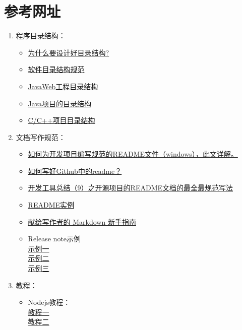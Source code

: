 \section{参考网址}
\begin{enumerate}
	
  \item 程序目录结构：
  \begin{itemize}
        \item
               \href{https://blog.csdn.net/aocheng6822/article/details/102252251?depth_1-utm_source=distribute.pc_relevant.none-task&utm_source=distribute.pc_relevant.none-task} {为什么要设计好目录结构?}
        \item \href{https://www.cnblogs.com/0zcl/p/6034396.html}
               {软件目录结构规范}
        \item \href{https://www.cnblogs.com/jiangzhaowei/p/9745310.html}
               {JavaWeb工程目录结构}
        \item \href{https://blog.csdn.net/weixin_44547599/article/details/90763754}
               {Java项目的目录结构}
        \item \href{https://github.com/hattonl/cpp-project-structure}
               {C/C++项目目录结构}
   \end{itemize}

\item 文档写作规范：
\begin{itemize}
	\item \href{https://www.cnblogs.com/wj-1314/p/8547763.html}
	     {如何为开发项目编写规范的README文件（windows），此文详解。}
	\item \href{https://www.zhihu.com/question/29100816}
	     {如何写好Github中的readme？}
	\item \href{https://www.jianshu.com/p/813b70d5b0de}
  	     {开发工具总结（9）之开源项目的README文档的最全最规范写法}
	\item \href{https://github.com/guodongxiaren/README}
	     {README实例}
	\item \href{https://www.jianshu.com/p/q81RER}
	     {献给写作者的 Markdown 新手指南}
	\item Release note示例\\
	    \href{https://www.jianshu.com/p/74945cce3367}{示例一}\\
	    \href{https://www.jianshu.com/p/2e98ee19be68}{示例二}\\
	    \href{https://help.aliyun.com/document_detail/26375.html}{示例三}
\end{itemize}

\item 教程：
\begin{itemize}
	\item Nodejs教程：\\
	    \href{https://www.w3cschool.cn/nodejs/}{教程一}\\
	    \href{https://www.runoob.com/nodejs/nodejs-tutorial.html}{教程二}
\end{itemize}

\end{enumerate}
